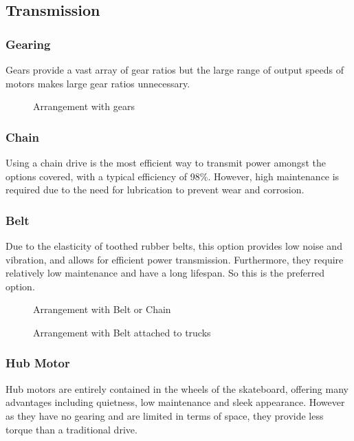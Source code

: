 \documentclass[journal,10pt]{IEEEtran}
\begin{document}
    \subsection{Transmission}
        \subsubsection{Gearing}
            Gears provide a vast array of gear ratios but the large range of output speeds of motors makes large gear ratios unnecessary.
        \begin{figure}[H]
            \centering
            \caption{Arrangement with gears}
            \label{fig:DrivetrainChain}
        \end{figure}
        \subsubsection{Chain}
            Using a chain drive is the most efficient way to transmit power amongst the options covered, with a typical efficiency of 98\%. \cite{Mechanical_Power_Transmission} However, high maintenance is required due to the need for lubrication to prevent wear and corrosion. 
        \subsubsection{Belt}
            Due to the elasticity of toothed rubber belts, this option provides low noise and vibration, and allows for efficient power transmission. Furthermore, they require relatively low maintenance and have a long lifespan. So this is the preferred option.
        \begin{figure}[H]
            \centering
            \caption{Arrangement with Belt or Chain}
            \label{fig:Drivetrain2}
        \end{figure}
        \begin{figure}[H]
            \centering
            \caption{Arrangement with Belt attached to trucks}
            \label{fig:Drivetrain3}
        \end{figure}
        \subsubsection{Hub Motor}
            Hub motors are entirely contained in the wheels of the skateboard, offering many advantages including quietness, low maintenance and sleek appearance.
            However as they have no gearing and are limited in terms of space, they provide less torque than a traditional drive. %
\end{document}
